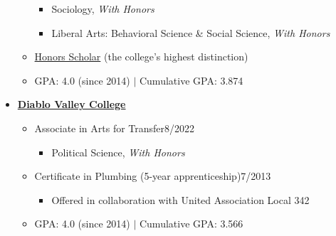 \begin{itemize}[leftmargin=0em, itemsep=0pt]
\begin{itemize}[leftmargin=2em, itemsep=0pt]
    \begin{itemize}[leftmargin=2em, itemsep=0pt]
        \item[] Sociology, \textit{With Honors}
        \item[] Liberal Arts: Behavioral Science \& Social Science, \textit{With Honors}
    \end{itemize}
    \item[] \href{https://www.losmedanos.edu/honors/prog.aspx}{Honors Scholar} (the college’s highest distinction)
    \item[] GPA: 4.0 (since 2014) $|$ Cumulative GPA: 3.874
\end{itemize}
\vspace{12pt}
\item[] \textbf{\href{https://www.dvc.edu/}{Diablo Valley College}}
\begin{itemize}[leftmargin=2em, itemsep=0pt]
    \item[] Associate in Arts for Transfer\hfill{}8/2022
    \begin{itemize}[leftmargin=2em, itemsep=0pt]
        \item[] Political Science, \textit{With Honors}
    \end{itemize}
    \item[] Certificate in Plumbing (5-year apprenticeship)\hfill{}7/2013
    \begin{itemize}[leftmargin=2em, itemsep=0pt]
        \item[] Offered in collaboration with United Association Local 342
    \end{itemize}
    \item[] GPA: 4.0 (since 2014) $|$ Cumulative GPA: 3.566
\end{itemize}
\end{itemize}
